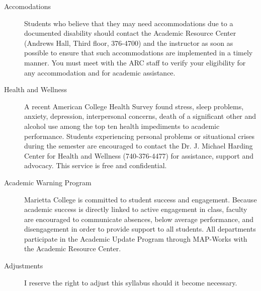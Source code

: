 \documentclass{tufte-handout}
\begin{document}
\begin{description}
\item[{Accomodations}] Students who believe that they may need accommodations due to
a documented disability should contact the Academic Resource
Center (Andrews Hall, Third floor, 376-4700) and the instructor as
soon as possible to ensure that such accommodations are
implemented in a timely manner. You must meet with the ARC staff
to verify your eligibility for any accommodation and for academic
assistance.

\item[{Health and Wellness}] A recent American College Health Survey found stress, sleep
problems, anxiety, depression, interpersonal concerns, death of a
significant other and alcohol use among the top ten health
impediments to academic performance.  Students experiencing
personal problems or situational crises during the semester are
encouraged to contact the Dr. J. Michael Harding Center for Health
and Wellness (740-376-4477) for assistance, support and advocacy.
This service is free and confidential.

\item[{Academic Warning Program}] Marietta College is committed to student success and engagement.
Because academic success is directly linked to active engagement
in class, faculty are encouraged to communicate absences, below
average performance, and disengagement in order to provide support
to all students.  All departments participate in the Academic
Update Program through MAP-Works with the Academic Resource
Center.
\end{description}


\begin{description}
\item[{Adjustments}] I reserve the right to adjust this syllabus should it become
necessary.
\end{description}
\end{document}
